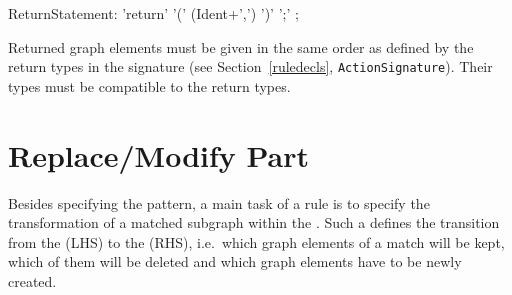 \begin{rail}
  ReturnStatement: 'return' '(' (Ident+',') ')' ';' ;
\end{rail}
Returned graph elements must be given in the same order as defined by the return types in the signature (see Section~\ref{ruledecls}, \texttt{ActionSignature}).
Their types must be compatible to the return types.

\section{Replace/Modify Part}
\label{replacepart}
Besides specifying the pattern, a main task of a rule is to specify the transformation of a matched subgraph within the . 
Such a  defines the transition from the  (LHS) to the  (RHS), i.e.\ which graph elements of a match will be kept, which of them will be deleted and which graph elements have to be newly created.

